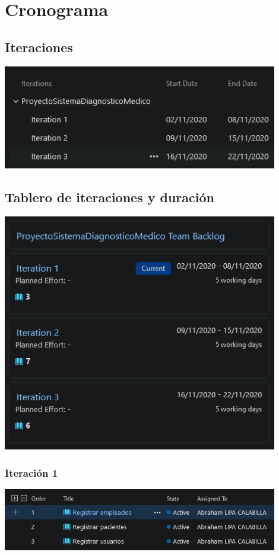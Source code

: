 \documentclass[preprint,12pt,notitlepage]{elsarticle}
\begin{document}
\section{Cronograma }
	
	\subsection{Iteraciones}
	\begin{center}
		\includegraphics[width=12cm]{./imagen/Screenshot_3.png} 
	\end{center}
	
	\subsection{Tablero de iteraciones y duración}
	\begin{center}
		\includegraphics[width=12cm]{./imagen/Screenshot_4.png} 
	\end{center}
	\subsubsection{Iteración 1}
	\begin{center}
	\includegraphics[width=12cm]{./imagen/Screenshot_7.png} 
	\end{center}
\end{document}
